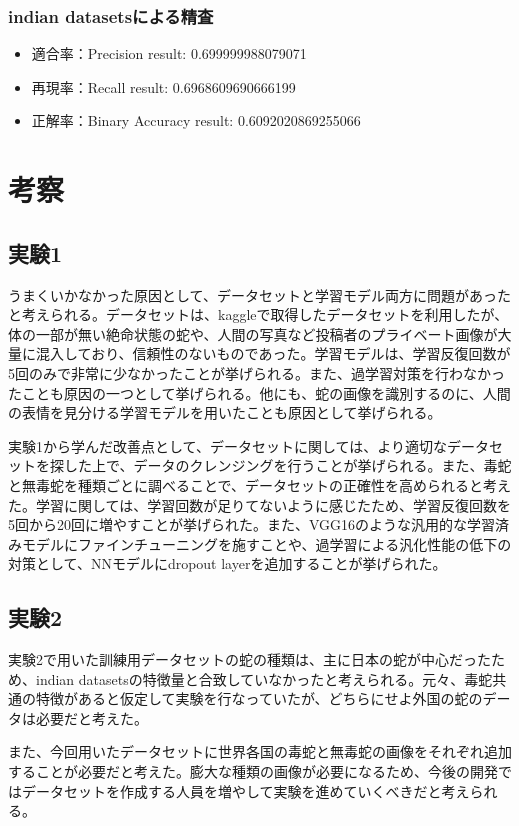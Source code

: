 \documentclass[a4paper, 11pt, titlepage]{jsarticle}
\begin{document}
\subsubsection{indian datasetsによる精査}
\begin{itemize}
\item 適合率：Precision result: 0.699999988079071
\item 再現率：Recall result: 0.6968609690666199
\item 正解率：Binary Accuracy result: 0.6092020869255066
\end{itemize}

\section{考察}
\subsection{実験1}
うまくいかなかった原因として、データセットと学習モデル両方に問題があったと考えられる。データセットは、kaggleで取得したデータセットを利用したが、体の一部が無い絶命状態の蛇や、人間の写真など投稿者のプライベート画像が大量に混入しており、信頼性のないものであった。学習モデルは、学習反復回数が5回のみで非常に少なかったことが挙げられる。また、過学習対策を行わなかったことも原因の一つとして挙げられる。他にも、蛇の画像を識別するのに、人間の表情を見分ける学習モデルを用いたことも原因として挙げられる。\par
実験1から学んだ改善点として、データセットに関しては、より適切なデータセットを探した上で、データのクレンジングを行うことが挙げられる。また、毒蛇と無毒蛇を種類ごとに調べることで、データセットの正確性を高められると考えた。学習に関しては、学習回数が足りてないように感じたため、学習反復回数を5回から20回に増やすことが挙げられた。また、VGG16のような汎用的な学習済みモデルにファインチューニングを施すことや、過学習による汎化性能の低下の対策として、NNモデルにdropout layerを追加することが挙げられた。\par

\subsection{実験2}
実験2で用いた訓練用データセットの蛇の種類は、主に日本の蛇が中心だったため、indian datasetsの特徴量と合致していなかったと考えられる。元々、毒蛇共通の特徴があると仮定して実験を行なっていたが、どちらにせよ外国の蛇のデータは必要だと考えた。\par
また、今回用いたデータセットに世界各国の毒蛇と無毒蛇の画像をそれぞれ追加することが必要だと考えた。膨大な種類の画像が必要になるため、今後の開発ではデータセットを作成する人員を増やして実験を進めていくべきだと考えられる。
\end{document}
